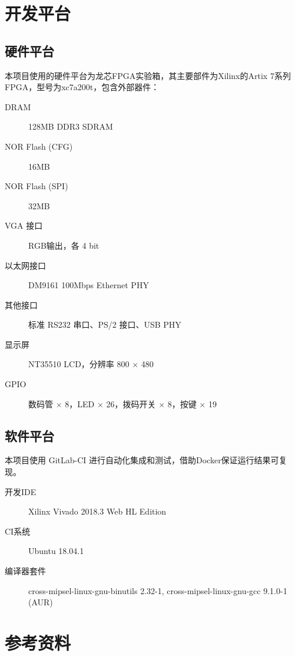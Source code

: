 \section{开发平台}

\subsection{硬件平台}

本项目使用的硬件平台为龙芯FPGA实验箱，其主要部件为Xilinx的Artix 7系列FPGA，型号为xc7a200t，包含外部器件：

\begin{description}
    \item[DRAM] 128MB DDR3 SDRAM 
    \item[NOR Flash (CFG)] 16MB
    \item[NOR Flash (SPI)] 32MB
    \item[VGA 接口] RGB输出，各 4 bit 
    \item[以太网接口] DM9161 100Mbps Ethernet PHY 
    \item[其他接口] 标准 RS232 串口、PS/2 接口、USB PHY
    \item[显示屏] NT35510 LCD，分辨率 800 $\times$ 480
    \item[GPIO] 数码管 $\times$  8，LED $\times$  26，拨码开关 $\times$ 8，按键 $\times$ 19
\end{description}

\subsection{软件平台}
\label{section:software_platform}

本项目使用 GitLab-CI 进行自动化集成和测试，借助Docker保证运行结果可复现。

\begin{description}
    \item[开发IDE] Xilinx Vivado 2018.3 Web HL Edition
    \item[CI系统] Ubuntu 18.04.1
    \item[编译器套件] cross-mipsel-linux-gnu-binutils 2.32-1, cross-mipsel-linux-gnu-gcc 9.1.0-1 (AUR)
\end{description}

\section{参考资料}

